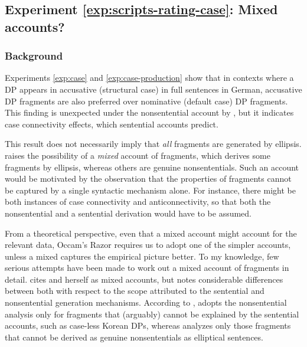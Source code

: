 \label{exp:scripts-rating-case}
\subsection{Experiment \ref{exp:scripts-rating-case}: Mixed accounts?}  \label{sec:scripts-rating-case}
\subsubsection{Background}

Experiments \ref{exp:case} and \ref{exp:case-production} show that in contexts where a DP appears in accusative (structural case) in full sentences in German, accusative DP fragments are also preferred over nominative (default case) DP fragments. This finding is unexpected under the nonsentential account by \citet{barton.progovac2005}, but it indicates case connectivity effects, which sentential accounts predict.

This result does not necessarily imply that \textit{all} fragments are generated by ellipsis. \citet{barton2006} raises the possibility of a \textit{mixed} account of fragments, which derives some fragments  by ellipsis, whereas others are genuine nonsententials. Such an account would be motivated by the observation that the properties of fragments cannot be captured by a single syntactic mechanism alone. For instance, there might be both instances of case connectivity and anticonnectivity, so that both the nonsentential and a sentential derivation would have to be assumed.

From a theoretical perspective, even that a mixed account might account for the relevant data, Occam's Razor requires us to adopt one of the simpler accounts, unless a mixed captures the empirical picture better. To my knowledge, few serious attempts have been made to work out a mixed account of fragments in detail. \citet{barton2006} cites \citet{morgan1989} and herself \citep{barton1998} as mixed accounts, but notes considerable differences between both with respect to the scope attributed to the sentential and nonsentential generation mechanisms. According to \citet{barton2006}, \citeauthor{morgan1989} adopts the nonsentential analysis only for fragments that (arguably) cannot be explained by the sentential accounts, such as case-less Korean  DPs, whereas \citet{barton1998} analyzes only those fragments that cannot be derived as genuine nonsententials as elliptical sentences. 

